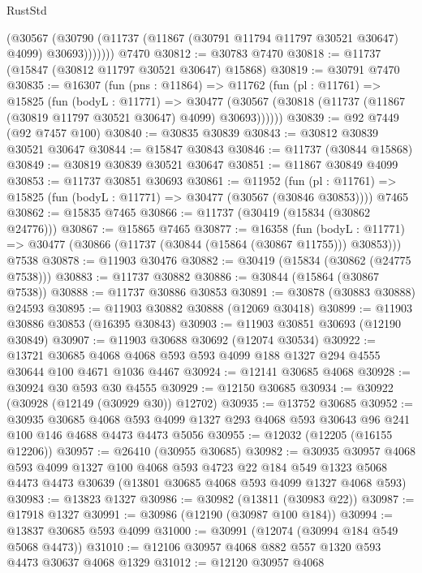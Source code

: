 \begin{lexlean}{RustStd}
\begin{coremodule}
            (@30567
              (@30790 (@11737 (@11867 (@30791 @11794 @11797 @30521 @30647) @4099) @30693)))))))
    @7470
@30812 := @30783 @7470
@30818 := @11737 (@15847 (@30812 @11797 @30521 @30647) @15868)
@30819 := @30791 @7470
@30835 := @16307
    (fun (pns : @11864) =>
    @11762
      (fun (pl : @11761) =>
      @15825
        (fun (bodyL : @11771) =>
        @30477 (@30567 (@30818 (@11737 (@11867 (@30819 @11797 @30521 @30647) @4099) @30693))))))
@30839 := @92 @7449 (@92 @7457 @100)
@30840 := @30835 @30839
@30843 := @30812 @30839 @30521 @30647
@30844 := @15847 @30843
@30846 := @11737 (@30844 @15868)
@30849 := @30819 @30839 @30521 @30647
@30851 := @11867 @30849 @4099
@30853 := @11737 @30851 @30693
@30861 := @11952
    (fun (pl : @11761) => @15825 (fun (bodyL : @11771) => @30477 (@30567 (@30846 @30853))))
    @7465
@30862 := @15835 @7465
@30866 := @11737 (@30419 (@15834 (@30862 @24776)))
@30867 := @15865 @7465
@30877 := @16358
    (fun (bodyL : @11771) => @30477 (@30866 (@11737 (@30844 (@15864 (@30867 @11755))) @30853)))
    @7538
@30878 := @11903 @30476
@30882 := @30419 (@15834 (@30862 (@24775 @7538)))
@30883 := @11737 @30882
@30886 := @30844 (@15864 (@30867 @7538))
@30888 := @11737 @30886 @30853
@30891 := @30878 (@30883 @30888) @24593
@30895 := @11903 @30882 @30888 (@12069 @30418)
@30899 := @11903 @30886 @30853 (@16395 @30843)
@30903 := @11903 @30851 @30693 (@12190 @30849)
@30907 := @11903 @30688 @30692 (@12074 @30534)
@30922 := @13721
    @30685
    @4068
    @4068
    @593
    @593
    @4099
    @188
    @1327
    @294
    @4555
    @30644
    @100
    @4671
    @1036
    @4467
@30924 := @12141 @30685 @4068
@30928 := @30924 @30 @593 @30 @4555
@30929 := @12150 @30685
@30934 := @30922 (@30928 (@12149 (@30929 @30)) @12702)
@30935 := @13752 @30685
@30952 := @30935
    @30685
    @4068
    @593
    @4099
    @1327
    @293
    @4068
    @593
    @30643
    @96
    @241
    @100
    @146
    @4688
    @4473
    @4473
    @5056
@30955 := @12032 (@12205 (@16155 @12206))
@30957 := @26410 (@30955 @30685)
@30982 := @30935
    @30957
    @4068
    @593
    @4099
    @1327
    @100
    @4068
    @593
    @4723
    @22
    @184
    @549
    @1323
    @5068
    @4473
    @4473
    @30639
    (@13801 @30685 @4068 @593 @4099 @1327 @4068 @593)
@30983 := @13823 @1327
@30986 := @30982 (@13811 (@30983 @22))
@30987 := @17918 @1327
@30991 := @30986 (@12190 (@30987 @100 @184))
@30994 := @13837 @30685 @593 @4099
@31000 := @30991 (@12074 (@30994 @184 @549 @5068 @4473))
@31010 := @12106 @30957 @4068 @882 @557 @1320 @593 @4473 @30637 @4068 @1329
@31012 := @12120 @30957 @4068

\end{coremodule}
\end{lexlean}
